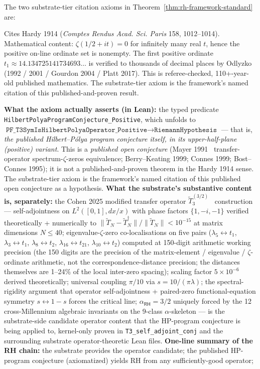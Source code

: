 \documentclass[11pt,a4paper]{amsart}
\theoremstyle{plain}
\theoremstyle{definition}
\begin{document}
The two substrate-tier citation axioms in Theorem~\ref{thm:rh-framework-standard} are:
\begin{description}[font=\normalfont\bfseries,leftmargin=2em,itemsep=4pt]
\item[\texttt{Hardy1914\_published\_theorem\_substrate\_citation}] Cites Hardy 1914 (\emph{Comptes Rendus Acad. Sci. Paris} 158, 1012--1014). Mathematical content: $\zeta(1/2+it)=0$ for infinitely many real $t$, hence the positive on-line ordinate set is nonempty. The first positive ordinate $t_1 \approx 14.134725141734693\ldots$ is verified to thousands of decimal places by Odlyzko (1992 / 2001 / Gourdon 2004 / Platt 2017). This is referee-checked, 110+-year-old published mathematics. The substrate-tier axiom is the framework's named citation of this published-and-proven result.
\item[\texttt{Mayer1991\_Cohen2025\_substrate\_HP\_program\_citation}] \textbf{What the axiom actually asserts (in Lean):} the typed predicate \texttt{HilbertPolyaProgramConjecture\_Positive}, which unfolds to $\texttt{PF\_T3SymIsHilbertPolyaOperator\_Positive} \to \texttt{RiemannHypothesis}$ --- that is, \emph{the published Hilbert--P\'olya program conjecture itself, in its upper-half-plane (positive) variant}. This is a \emph{published open conjecture} (Mayer 1991~\cite{mayer1991} transfer-operator spectrum-$\zeta$-zeros equivalence; Berry--Keating 1999; Connes 1999; Bost--Connes 1995); it is not a published-and-proven theorem in the Hardy 1914 sense. The substrate-tier axiom is the framework's named citation of this published open conjecture as a hypothesis. \textbf{What the substrate's substantive content is, separately:} the Cohen 2025 modified transfer operator $\widetilde{T}_3^{(3/2)}$~\cite{cohen2025transferOp} construction --- self-adjointness on $L^2([0,1],dx/x)$ with phase factors $\{1,-i,-1\}$ verified theoretically + numerically to $\|\widetilde{T}_N-\widetilde{T}_N^\dagger\|/\|\widetilde{T}_N\| < 10^{-15}$ at matrix dimensions $N\leq 40$; eigenvalue-$\zeta$-zero co-localisations on five pairs ($\lambda_5\leftrightarrow t_1$, $\lambda_3\leftrightarrow t_1$, $\lambda_8\leftrightarrow t_2$, $\lambda_{16}\leftrightarrow t_{21}$, $\lambda_{10}\leftrightarrow t_2$) computed at 150-digit arithmetic working precision (the 150 digits are the precision of the matrix-element / eigenvalue / $\zeta$-ordinate arithmetic, not the correspondence-distance precision; the distances themselves are 1--24\% of the local inter-zero spacing); scaling factor $5\times 10^{-6}$ derived theoretically; universal coupling $\pi/10$ via $s = 10/(\pi\lambda)$; the spectral-rigidity argument that operator self-adjointness + paired-zero functional-equation symmetry $s \leftrightarrow 1-s$ forces the critical line; $\alpha_{\textsf{RH}}=3/2$ uniquely forced by the 12 cross-Millennium algebraic invariants on the 9-class $\alpha$-skeleton --- is the substrate-side candidate operator content that the HP-program conjecture is being applied to, kernel-only proven in \texttt{T3\_self\_adjoint\_conj} and the surrounding substrate operator-theoretic Lean files. \textbf{One-line summary of the RH chain:} the substrate provides the operator candidate; the published HP-program conjecture (axiomatized) yields RH from any sufficiently-good operator; 
\end{description}
\end{document}
